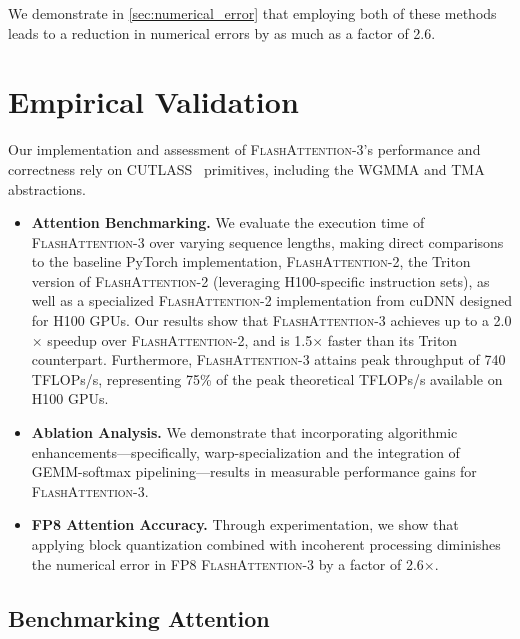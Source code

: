 \begin{enumerate}
We demonstrate in \cref{sec:numerical_error} that employing both of these methods leads to a reduction in numerical errors by as much as a factor of 2.6.

\section{Empirical Validation}
\label{sec:exp}

Our implementation and assessment of \textsc{FlashAttention-3}'s performance and correctness rely on CUTLASS~\citep{Thakkar_CUTLASS_2023} primitives, including the WGMMA and TMA abstractions.

\begin{itemize}

\item \textbf{Attention Benchmarking.} We evaluate the execution time of \textsc{FlashAttention-3} over varying sequence lengths, making direct comparisons to the baseline PyTorch implementation, \textsc{FlashAttention-2}, the Triton version of \textsc{FlashAttention-2} (leveraging H100-specific instruction sets), as well as a specialized \textsc{FlashAttention-2} implementation from cuDNN designed for H100 GPUs. Our results show that \textsc{FlashAttention-3} achieves up to a 2.0$\times$ speedup over \textsc{FlashAttention-2}, and is 1.5$\times$ faster than its Triton counterpart. Furthermore, \textsc{FlashAttention-3} attains peak throughput of 740 TFLOPs/s, representing 75\% of the peak theoretical TFLOPs/s available on H100 GPUs.

\item \textbf{Ablation Analysis.} We demonstrate that incorporating algorithmic enhancements—specifically, warp-specialization and the integration of GEMM-softmax pipelining—results in measurable performance gains for \textsc{FlashAttention-3}.

\item \textbf{FP8 Attention Accuracy.} Through experimentation, we show that applying block quantization combined with incoherent processing diminishes the numerical error in FP8 \textsc{FlashAttention-3} by a factor of 2.6$\times$.
\end{itemize}

\subsection{Benchmarking Attention}
\label{subsec:benchmark_attn}


\end{enumerate}
